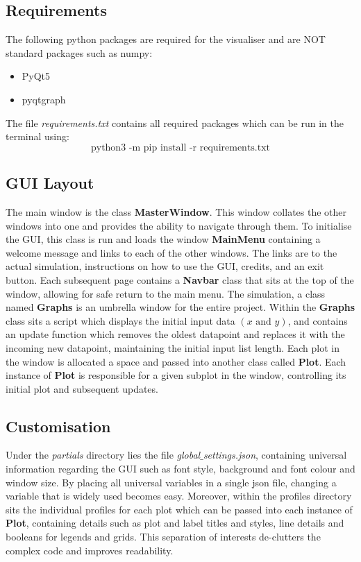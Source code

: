 \documentclass[12pt, a4paper]{article}
\begin{document}
\subsection{Requirements}
The following python packages are required for the visualiser and are NOT standard packages such as numpy:
\begin{itemize}
\item PyQt5
\item pyqtgraph
\end{itemize}
The file \textit{requirements.txt} contains all required packages which can be run in the terminal using:
\begin{equation}
\text{python3 -m pip install -r requirements.txt}
\end{equation}

\subsection{GUI Layout}
The main window is the class \textbf{MasterWindow}. This window collates the other windows into one and provides the ability to navigate through them. To initialise the GUI, this class is run and loads the window \textbf{MainMenu} containing a welcome message and links to each of the other windows. The links are to the actual simulation, instructions on how to use the GUI, credits, and an exit button. Each subsequent page contains a \textbf{Navbar} class that sits at the top of the window, allowing for safe return to the main menu. The simulation, a class named \textbf{Graphs} is an umbrella window for the entire project. Within the \textbf{Graphs} class sits a script which displays the initial input data $(x \text{ and } y)$, and contains an update function which removes the oldest datapoint and replaces it with the incoming new datapoint, maintaining the initial input list length. Each plot in the window is allocated a space and passed into another class called \textbf{Plot}. Each instance of \textbf{Plot} is responsible for a given subplot in the window, controlling its initial plot and subsequent updates.

\subsection{Customisation}
Under the \textit{partials} directory lies the file \textit{global$\_$settings.json}, containing universal information regarding the GUI such as font style, background and font colour and window size. By placing all universal variables in a single json file, changing a variable that is widely used becomes easy. Moreover, within the profiles directory sits the individual profiles for each plot which can be passed into each instance of \textbf{Plot}, containing details such as plot and label titles and styles, line details and booleans for legends and grids. This separation of interests de-clutters the complex code and improves readability.
\end{document}
